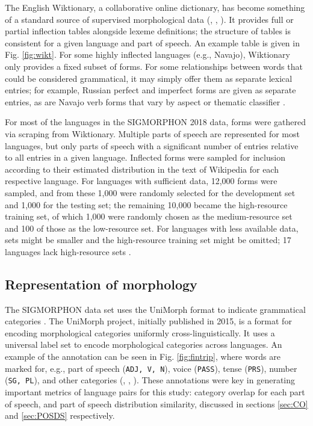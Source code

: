 The English Wiktionary, a collaborative online dictionary, has become something of a standard source of supervised morphological data (\cite{Cotterell2016}, \cite{Cotterell2017a}, \cite{Cotterell2018b}). It provides full or partial inflection tables alongside lexeme definitions; the structure of tables is consistent for a given language and part of speech. An example table is given in Fig. \ref{fig:wikt}. For some highly inflected languages (e.g., Navajo), Wiktionary only provides a fixed subset of forms. For some relationships between words that could be considered grammatical, it may simply offer them as separate lexical entries; for example, Russian perfect and imperfect forms are given as separate entries, as are Navajo verb forms that vary by aspect or thematic classifier \parencite{Wiktionary}.  

For most of the languages in the SIGMORPHON 2018 data, forms were gathered via scraping from Wiktionary. Multiple parts of speech are represented for most languages, but only parts of speech with a significant number of entries relative to all entries in a given language. Inflected forms were sampled for inclusion according to their estimated distribution in the text of Wikipedia for each respective language. For languages with sufficient data, 12,000 forms were sampled, and from these 1,000 were randomly selected for the development set and 1,000 for the testing set; the remaining 10,000 became the high-resource training set, of which 1,000 were randomly chosen as the medium-resource set and 100 of those as the low-resource set. For languages with less available data, sets might be smaller and the high-resource training set might be omitted; 17 languages lack high-resource sets \parencite{Cotterell2018b}.

\subsection{Representation of morphology}

The SIGMORPHON data set uses the UniMorph format to indicate grammatical categories  \parencite{Cotterell2018b}. The UniMorph project, initially published in 2015, is a format for encoding morphological categories uniformly cross-linguistically. It uses a universal label set to encode morphological categories across languages. An example of the annotation can be seen in Fig. \ref{fig:fintrip}, where words are marked for, e.g., part of speech (\texttt{ADJ, V, N}), voice (\texttt{PASS}), tense (\texttt{PRS}), number (\texttt{SG, PL}), and other categories (\cite{SylakGlassman2015}, \cite{SylakGlassman2015a}, \cite{SylakGlassman2016}). These annotations were key in generating important metrics of language pairs for this study: category overlap for each part of speech, and part of speech distribution similarity, discussed in sections \ref{sec:CO} and \ref{sec:POSDS} respectively.

